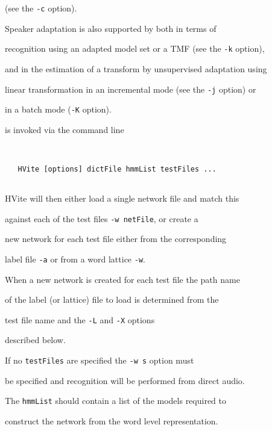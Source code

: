 (see the  \texttt{-c} option).


Speaker adaptation is also supported by  both in terms of 


recognition using an adapted model set or a TMF (see the \texttt{-k} option),  


and in the estimation of a transform by unsupervised adaptation using 


linear transformation  in an incremental mode (see the \texttt{-j} option) or 


in a batch mode (\texttt{-K} option).










 is invoked via the command line


\begin{verbatim}


   HVite [options] dictFile hmmList testFiles ...


\end{verbatim}


HVite will then either load a single network file and match this


against each of the test files \texttt{-w netFile}, or create a


new network for each test file either from the corresponding 


label file \texttt{-a} or from a word lattice \texttt{-w}.


When a new network is created for each test file the path name


of the label (or lattice) file to load is determined from the


test file name and the \texttt{-L} and \texttt{-X} options


described below.





If no \texttt{testFiles} are specified the \texttt{-w s} option must


be specified and recognition will be performed from direct audio.





The \texttt{hmmList} should contain a list of the models required to


construct the network from the word level representation.





